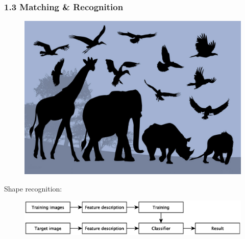 \documentclass[notheorems,serif,table,compress]{beamer}  %
\begin{document}
\begin{frame}
\frametitle{1.3 Matching \& Recognition}
    \begin{figure}
        \includegraphics[width=0.5\linewidth]{reg}
    \end{figure}
    \pause
    Shape recognition:
    \begin{tcolorbox}[colback=red!5,colframe=blue!75!black]
        \begin{figure}
            \includegraphics[width=1\linewidth]{recogChart} 
        \end{figure}
    \end{tcolorbox}
\end{frame}
\end{document}

